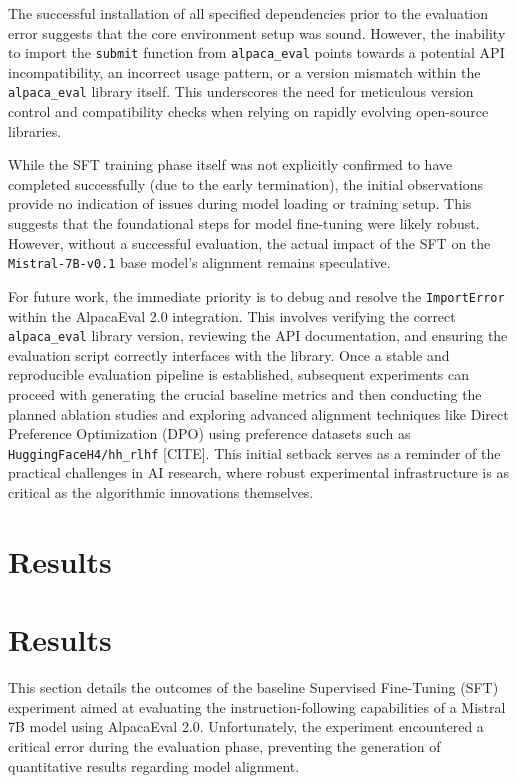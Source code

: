 \documentclass[11pt]{article}
\begin{document}
The successful installation of all specified dependencies prior to the evaluation error suggests that the core environment setup was sound. However, the inability to import the \texttt{submit} function from \texttt{alpaca\_eval} points towards a potential API incompatibility, an incorrect usage pattern, or a version mismatch within the \texttt{alpaca\_eval} library itself. This underscores the need for meticulous version control and compatibility checks when relying on rapidly evolving open-source libraries.

While the SFT training phase itself was not explicitly confirmed to have completed successfully (due to the early termination), the initial observations provide no indication of issues during model loading or training setup. This suggests that the foundational steps for model fine-tuning were likely robust. However, without a successful evaluation, the actual impact of the SFT on the \texttt{Mistral-7B-v0.1} base model's alignment remains speculative.

For future work, the immediate priority is to debug and resolve the \texttt{ImportError} within the AlpacaEval 2.0 integration. This involves verifying the correct \texttt{alpaca\_eval} library version, reviewing the API documentation, and ensuring the evaluation script correctly interfaces with the library. Once a stable and reproducible evaluation pipeline is established, subsequent experiments can proceed with generating the crucial baseline metrics and then conducting the planned ablation studies and exploring advanced alignment techniques like Direct Preference Optimization (DPO) using preference datasets such as \texttt{HuggingFaceH4/hh\_rlhf} [CITE]. This initial setback serves as a reminder of the practical challenges in AI research, where robust experimental infrastructure is as critical as the algorithmic innovations themselves.

\section{Results}

\section{Results}
This section details the outcomes of the baseline Supervised Fine-Tuning (SFT) experiment aimed at evaluating the instruction-following capabilities of a Mistral 7B model using AlpacaEval 2.0. Unfortunately, the experiment encountered a critical error during the evaluation phase, preventing the generation of quantitative results regarding model alignment.
\end{document}
